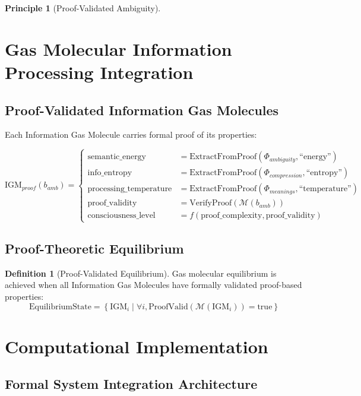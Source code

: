 \documentclass[12pt,a4paper]{article}
\theoremstyle{definition}
\newtheorem{definition}{Definition}
\newtheorem{principle}{Principle}
\begin{document}
\begin{principle}[Proof-Validated Ambiguity]
\section{Gas Molecular Information Processing Integration}

\subsection{Proof-Validated Information Gas Molecules}

Each Information Gas Molecule carries formal proof of its properties:

\begin{equation}
\text{IGM}_{proof}(b_{amb}) = \begin{cases}
\text{semantic\_energy} &= \text{ExtractFromProof}(\Phi_{ambiguity}, \text{``energy''}) \\
\text{info\_entropy} &= \text{ExtractFromProof}(\Phi_{compression}, \text{``entropy''}) \\
\text{processing\_temperature} &= \text{ExtractFromProof}(\Phi_{meanings}, \text{``temperature''}) \\
\text{proof\_validity} &= \text{VerifyProof}(\mathcal{M}(b_{amb})) \\
\text{consciousness\_level} &= f(\text{proof\_complexity}, \text{proof\_validity})
\end{cases}
\end{equation}

\subsection{Proof-Theoretic Equilibrium}

\begin{definition}[Proof-Validated Equilibrium]
Gas molecular equilibrium is achieved when all Information Gas Molecules have formally validated proof-based properties:
\begin{equation}
\text{EquilibriumState} = \left\{\text{IGM}_i \mid \forall i, \text{ProofValid}(\mathcal{M}(\text{IGM}_i)) = \text{true}\right\}
\end{equation}
\end{definition}

\section{Computational Implementation}

\subsection{Formal System Integration Architecture}


\end{principle}
\end{document}
